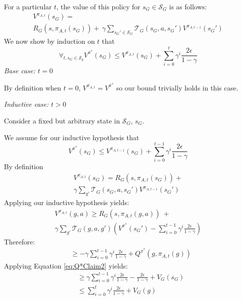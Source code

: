For a particular $t$, the value of this policy for $s_G \in \mathcal{S}_G$ is as follows:
\begin{multline*}
V^{\pi_{A,t}}(s_G) = \\
R_G(s, \pi_{A,t}(s_G)) +\ \gamma \sum_{{s_G}' \in \mathcal{S}_G}\mathcal{T}_G(s_G, a, {s_G}')V^{\pi_{A,t-1}}({s_G}')
\end{multline*}
We now show by induction on $t$ that
\begin{equation}
\forall_{t, s_G \in \mathcal{S}_g} V^{\pi^*}(s_G) \leq  V^{\pi_{A,t}}(s_G) + \sum_{i=0}^{t}\gamma^i \frac{2\epsilon}{1-\gamma}
\end{equation}
\textit{Base case: $t=0$}

By definition when $t=0$, $V^{\pi_{A,t}} = V^{\pi^*}$ so our bound trivially holds in this case.

\textit{Inductive case: $t > 0$}

Consider a fixed but arbitrary state in $\mathcal{S}_G$, $s_G$.

We assume for our inductive hypothesis that
\begin{equation}
V^{\pi^*}(s_G) \leq V^{\pi_{A,t-1}}(s_G)  + \sum_{i=0}^{t-1}\gamma^i \frac{2\epsilon}{1-\gamma}
\end{equation}
By definition 
\begin{multline*}
V^{\pi_{A,t}}(s_G) = R_G(s, \pi_{A,t}(s_G)) + \\ \gamma \sum_{g'}\mathcal{T}_G(s_G, a, {s_G}')V^{\pi_{A,t-1}}({s_G}')
\end{multline*}
Applying our inductive hypothesis yields:
\begin{multline*}
V^{\pi_{A,t}}(g, a) \geq R_G(s, \pi_{A,t}(g, a))\ + \\ \gamma \sum_{g'}\mathcal{T}_G(g, a, g')\left(V^{\pi^*}({s_G}') - \sum_{i=0}^{t-1}\gamma^i \frac{2\epsilon}{1-\gamma} \right)
\end{multline*}
Therefore:
\begin{align*}
&\geq -\gamma\sum_{i=0}^{t-1}\gamma^i \frac{2\epsilon}{1-\gamma} + Q^{\pi^*}(g, \pi_{A,t} (g))
\end{align*}
Applying Equation \ref{eq:Q*Claim2} yields:
\begin{align*}
&\geq \gamma\sum_{i=0}^{t-1}\gamma^i \frac{2\epsilon}{1-\gamma} - \frac{2\epsilon}{1-\gamma} + V_{G}(s_G)\\
&\leq \sum_{i=0}^{t}\gamma^i \frac{2\epsilon}{1-\gamma} + V_G(g)
\end{align*}

